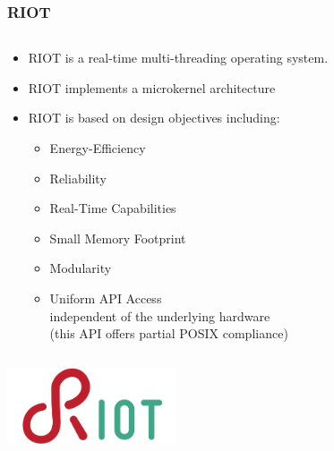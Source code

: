 \documentclass{beamer}
\begin{document}
\begin{frame}
	\frametitle{RIOT}
	\begin{columns}[c]
		\begin{column}{30cm}
			\vspace{.1cm}
			\begin{itemize}
				\justifying
				\item RIOT is a \textcolor{TextOrange}{real-time}
				\textcolor{TextOrange}{multi-threading} operating system.
				\item RIOT implements a \textcolor{TextGreen}{microkernel} architecture
				\item RIOT is based on design objectives including:
				\begin{itemize}
					\justifying
					\item Energy-Efficiency
					\item Reliability
					\item Real-Time Capabilities
					\item Small Memory Footprint
					\item Modularity
					\item Uniform API Access\\
					independent of the underlying hardware\\
					(this API offers partial POSIX compliance)
				\end{itemize}
			\end{itemize}
		\end{column}
	\end{columns}
	\vspace{.25cm}
	\hspace*{7cm} \includegraphics[width=5cm]{figs/riot-logo.png}
\end{frame}
\end{document}
